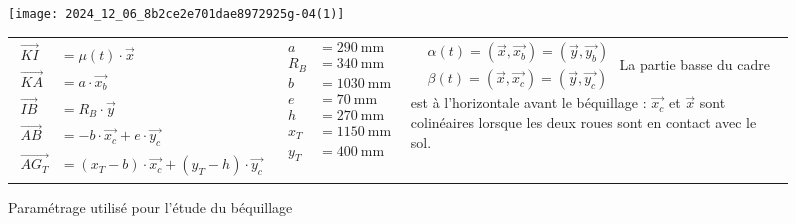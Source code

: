 \begin{figure}[!htb]
\centering

\texttt{[image: 2024\_12\_06\_8b2ce2e701dae8972925g-04(1)]}

\begin{tabular}{p{5cm}p{5cm}p{5cm}}
$
\begin{aligned}
\overrightarrow{K I} & =\mu(t) \cdot \vec{x} \\
\overrightarrow{K A} & =a \cdot \overrightarrow{x_{b}} \\
\overrightarrow{I B} & =R_{B} \cdot \vec{y} \\
\overrightarrow{A B} & =-b \cdot \overrightarrow{x_{c}}+e \cdot \overrightarrow{y_{c}} \\
\overrightarrow{A G_{T}} & =\left(x_{T}-b\right) \cdot \overrightarrow{x_{c}}+\left(y_{T}-h\right) \cdot \overrightarrow{y_{c}}
\end{aligned}
$
&
$
\begin{aligned}
a & =290 \mathrm{~mm} \\
R_{B} & =340 \mathrm{~mm} \\
b & =1030 \mathrm{~mm} \\
e & =70 \mathrm{~mm} \\
h & =270 \mathrm{~mm} \\
x_{T} & =1150 \mathrm{~mm} \\
y_{T} & =400 \mathrm{~mm}
\end{aligned}
$
&
$
\begin{aligned}
& \alpha(t)=\left(\vec{x}, \overrightarrow{x_{b}}\right)=\left(\vec{y}, \overrightarrow{y_{b}}\right) \\
& \beta(t)=\left(\vec{x}, \overrightarrow{x_{c}}\right)=\left(\vec{y}, \overrightarrow{y_{c}}\right)
\end{aligned}
$
La partie basse du cadre est à l'horizontale avant le béquillage : \(\overrightarrow{x_{c}}\) et \(\vec{x}\) sont colinéaires lorsque les deux roues sont en contact avec le sol.
\\
\end{tabular}
\caption{\label{fig_23} Paramétrage utilisé pour l'étude du béquillage}

\end{figure}




